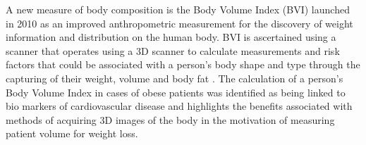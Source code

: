 A new measure of body composition is the Body Volume Index (BVI) launched in 2010 as an improved anthropometric measurement for the discovery of weight information and distribution on the human body. 
BVI is ascertained using a scanner that operates using a 3D scanner to calculate measurements and risk factors that could be associated with a person's body shape and type through the capturing of their weight, volume and body fat \cite{BVIRelease}. 
The calculation of a person's Body Volume Index in cases of obese patients was identified as being linked  to bio markers of cardiovascular disease and highlights the benefits associated with methods of acquiring 3D images of the body in the motivation of measuring patient volume for weight loss.











